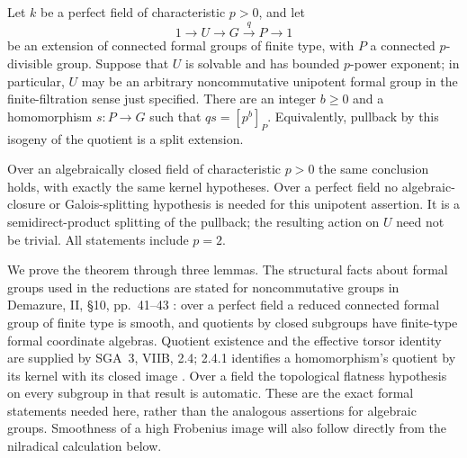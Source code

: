 \begin{theorem}
\label{C:formal-noncommutative-unipotent}
Let $k$ be a perfect field of characteristic $p>0$, and let
\[
 1\longrightarrow U\longrightarrow G\xrightarrow{q}P
 \longrightarrow1
\]
be an extension of connected formal groups of finite type, with $P$ a
connected $p$-divisible group.  Suppose that $U$ is solvable and has
bounded $p$-power exponent; in particular, $U$ may be an arbitrary
noncommutative unipotent formal group in the finite-filtration sense
just specified.  There are an integer $b\geq0$ and a homomorphism
$s:P\to G$ such that $qs=[p^b]_P$.  Equivalently, pullback by this
isogeny of the quotient is a split extension.

Over an algebraically closed field of characteristic $p>0$ the same
conclusion holds, with exactly the same kernel hypotheses.  Over a
perfect field no algebraic-closure or Galois-splitting hypothesis is
needed for this unipotent assertion.  It is a semidirect-product
splitting of the pullback; the resulting action on $U$ need not be
trivial.  All statements include $p=2$.
\end{theorem}

We prove the theorem through three lemmas.  The structural facts about
formal groups used in the reductions are stated for noncommutative
groups in Demazure, II, \S10, pp.~41--43
\cite{C4-Demazure1972}: over a perfect field a reduced connected formal
group of finite type is smooth, and quotients by closed subgroups have
finite-type formal coordinate algebras.  Quotient existence and the
effective torsor identity are supplied by SGA~3, VIIB, 2.4; 2.4.1
identifies a homomorphism's quotient by its kernel with its closed
image \cite{C4-SGA3VIIB}.  Over a field the topological flatness
hypothesis on every subgroup in that result is automatic.  These are
the exact formal statements needed here, rather than the analogous
assertions for algebraic groups.  Smoothness of a high Frobenius image
will also follow directly from the nilradical calculation below.

